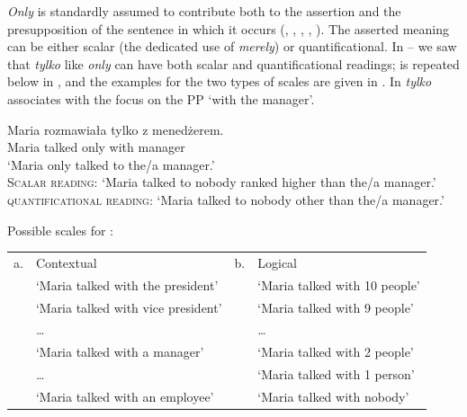 \documentclass[output=paper,colorlinks,citecolor=brown]{langscibook}
\begin{document}
\textit{Only} is standardly assumed to contribute both to the assertion and the presupposition of the sentence in which it occurs (\citealt{horn69}, \citealt{klinedinst05}, \citealt{roberts06,roberts11}, \citealt{vanrooijschulz07}, \citealt{beaverclark08}). The asserted meaning can be either scalar (the dedicated use of \textit{merely}) or quantificational. In -- we saw that \textit{tylko} like \textit{only} can have both scalar and quantificational readings;  is repeated below in , and the examples for the two types of scales are given in . In  \textit{tylko} associates with the focus on the PP `with the manager'.

\ea\label{ex:tom:24}
\gll Maria rozmawiała tylko z menedżerem.\\
Maria talked only with manager\\
\glt `Maria only talked to the/a manager.’\\
\textsc{Scalar} \textsc{reading}: `Maria talked to nobody ranked higher than the/a manager.'\\
\textsc{quantificational} \textsc{reading}: `Maria talked to nobody other than the/a manager.'
\z 


\ea\label{ex:tom:25}
Possible scales for :
\begin{tabularx}{.96\textwidth}{l@{~~}ll@{~~}X}
a.& Contextual&b.& Logical\\
&{`Maria talked with the president'}&&{`Maria talked with 10 people'}\\
&{`Maria talked with vice president'}&&{`Maria talked with 9 people'}\\
&{ …}&&{ …}\\
&{`Maria talked with a manager'}&&{`Maria talked with 2 people'}\\
&{\dots}&&{`Maria talked with 1 person'}\\

&{`Maria talked with an employee'}&&`Maria talked with nobody'\\
\end{tabularx}
\z
\end{document}
